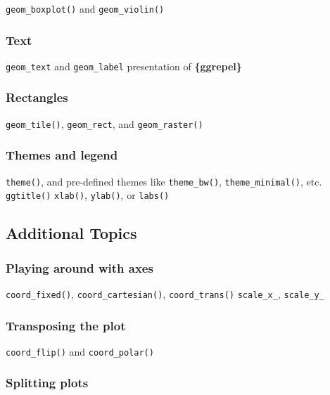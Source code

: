 \documentclass[
]{book}
\begin{document}
\texttt{geom\_boxplot()} and \texttt{geom\_violin()}

\hypertarget{text}{%
\subsubsection{Text}\label{text}}

\texttt{geom\_text} and \texttt{geom\_label}
presentation of \textbf{\{ggrepel\}}

\hypertarget{rectangles}{%
\subsubsection{Rectangles}\label{rectangles}}

\texttt{geom\_tile()}, \texttt{geom\_rect}, and \texttt{geom\_raster()}

\hypertarget{themes-and-legend}{%
\subsubsection{Themes and legend}\label{themes-and-legend}}

\texttt{theme()}, and pre-defined themes like \texttt{theme\_bw()}, \texttt{theme\_minimal()}, etc.
\texttt{ggtitle()}
\texttt{xlab()}, \texttt{ylab()}, or \texttt{labs()}

\hypertarget{additional-topics}{%
\subsection{Additional Topics}\label{additional-topics}}

\hypertarget{playing-around-with-axes}{%
\subsubsection{Playing around with axes}\label{playing-around-with-axes}}

\texttt{coord\_fixed()}, \texttt{coord\_cartesian()}, \texttt{coord\_trans()}
\texttt{scale\_x\_}, \texttt{scale\_y\_}

\hypertarget{transposing-the-plot}{%
\subsubsection{Transposing the plot}\label{transposing-the-plot}}

\texttt{coord\_flip()} and \texttt{coord\_polar()}

\hypertarget{splitting-plots}{%
\subsubsection{Splitting plots}\label{splitting-plots}}
\end{document}

